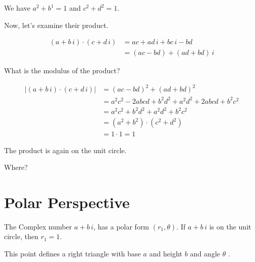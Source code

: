 \documentclass{ximera}
\begin{document}
We have $a^2 + b^1 = 1$  and $c^2 + d^2 = 1$.



Now, let's examine their product.






\begin{align*}
(a + b \, i) \cdot (c + d \, i)      & = ac + ad \, i + bc \, i - bd   \\
                & = (ac - bd) + (ad + bd) \, i
\end{align*}



What is the modulus of the product?





\begin{align*}
|(a + b \, i) \cdot (c + d \, i)|      & = (ac - bd)^2 + (ad + bd)^2   \\
                & = a^2c^2 - 2abcd + b^2d^2 + a^2d^2 + 2abcd + b^2c^2  \\
                & = a^2c^2 + b^2d^2 + a^2d^2 + b^2c^2  \\
                & = (a^2 + b^2) \cdot (c^2 + d^2)   \\
                & = 1 \cdot 1 = 1
\end{align*}



The product is again on the unit circle.


Where?




\section{Polar Perspective}



The Complex number $a + b \, i$, has a polar form $(r_1, \theta)$.  If  $a + b \, i$ is on the unit circle, then $r_1 = 1$.




This point defines a right triangle with base $a$ and height $b$ and angle $\theta$ .  
\end{document}
